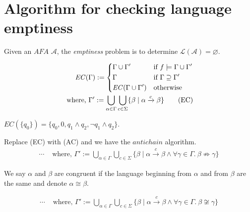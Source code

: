 \section{Algorithm for checking language emptiness}
Given an \( \mathit{AFA}\) \( \mathcal{A} \), the \textit{emptiness} problem is
to determine \( \mathcal{L}(\mathcal{A}) = \varnothing \).

\begin{definition}
  \begin{align*}
    \mathit{EC}(\Gamma) :=
    \begin{dcases}
    \Gamma \cup \Gamma'              &\text{if } f \models \Gamma \cup \Gamma'
    \\
    \Gamma                           &\text{if } \Gamma \supseteq \Gamma'
    \\
    \mathit{EC}(\Gamma \cup \Gamma') &\text{otherwise } 
    \end{dcases}
    \\
    \text{ where, } \Gamma' :=
    \bigcup\limits_{\alpha \in \Gamma}
    \bigcup\limits_{c \in \Sigma}
    \{ \beta \mid \alpha \xrightarrow[]c \beta \}
    \tag{EC}
  \end{align*}
\end{definition}

\begin{example}
\( \mathit{EC}(\{ q_0 \}) = \{ q_0, 0, q_1 \wedge q_2, \neg q_1 \wedge q_2 \} \).
\end{example}

\begin{definition}
Replace (EC) with (AC) and we have the \( \mathit{antichain} \) algorithm. 
    \begin{align*} \cdots & \text{ where, } \Gamma' :=
    \bigcup\limits_{\alpha \in \Gamma}
    \bigcup\limits_{c \in \Sigma}
    \{
    \beta \mid \alpha \xrightarrow[]c \beta
    \wedge
    \forall \gamma \in \Gamma .\ \beta \not \Rightarrow \gamma
    \}
    \tag{AC}
    \end{align*}
\end{definition}

We say \( \alpha \) and \( \beta \) are congruent if the language beginning from
\( \alpha \) and from \( \beta \) are the same and denote \( \alpha \cong
\beta\).

\begin{definition}
  \begin{align*} \cdots & \text{ where, } \Gamma' :=
    \bigcup\limits_{\alpha \in \Gamma}
    \bigcup\limits_{c \in \Sigma}
    \{
    \beta \mid \alpha \xrightarrow[]c \beta
    \wedge
    \forall \gamma \in \Gamma .\ \beta \not \cong \gamma
    \}
    \tag{CC}
  \end{align*}
\end{definition}

